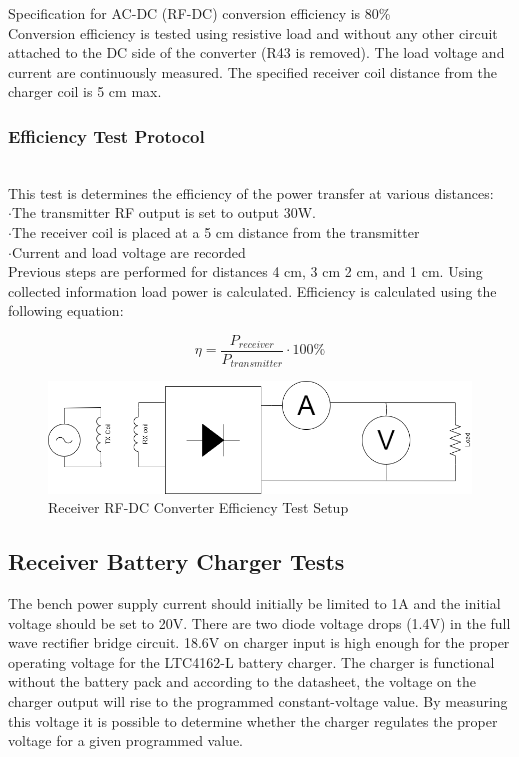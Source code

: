 \documentclass[12pt]{article}
\begin{document}
\noindent
Specification  for AC-DC (RF-DC) conversion efficiency is 80\%\\
 
\noindent
Conversion efficiency is tested using resistive load and without any other circuit attached to the DC side of the converter (R43 is removed). The load voltage and current are continuously  measured.  The specified receiver coil distance from the charger coil is 5 cm max.
\subsubsection*{Efficiency Test Protocol}\hfill \\
\noindent
This test is determines the efficiency of the power transfer at various distances:\\
\indent \indent $\cdot$The transmitter RF output is set to output 30W.\\
\indent \indent $\cdot$The receiver coil is placed at a 5 cm distance from the transmitter\\
\indent \indent $\cdot$Current and load voltage are recorded\\

\noindent
Previous steps are performed for distances 4 cm, 3 cm 2 cm, and 1 cm.  Using collected information load power is calculated.  Efficiency is calculated using the following equation:

\begin{equation}
\eta = \frac{P_{receiver}}{P_{transmitter}} \cdot 100\%
\end{equation}
\hfill
\begin{figure}[h!]
\centering
\includegraphics[width=0.8\linewidth]{RX_EFF_TEST}
\caption{Receiver RF-DC Converter Efficiency Test Setup}
\end{figure}

\subsection{Receiver Battery Charger Tests}

\indent
The bench power supply current should initially be limited to 1A and the initial voltage should be set to 20V.  There are two diode voltage drops (1.4V) in the full wave rectifier bridge circuit.  18.6V on charger input is high enough for the proper operating voltage for the LTC4162-L battery charger.  The charger is functional without the battery pack and according to the datasheet, the voltage on the charger output will rise to the programmed constant-voltage value. By measuring this voltage it is possible to determine whether the charger regulates the proper voltage for a given programmed value.
\hfill 
\pagebreak
\hfill \\
\end{document}
